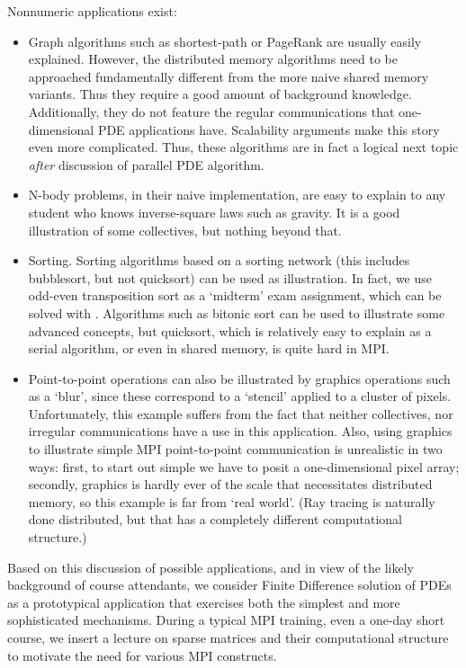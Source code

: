 Nonnumeric applications exist:
\begin{itemize}
\item Graph algorithms such as shortest-path or PageRank are usually
  easily explained. However, the distributed memory algorithms need to
  be approached fundamentally different from the more naive shared
  memory variants. Thus they require a good amount of background
  knowledge. Additionally, they do not feature the regular
  communications that one-dimensional PDE applications
  have. Scalability arguments make this story even more
  complicated. Thus, these algorithms are in fact a logical next topic
  \emph{after} discussion of parallel PDE algorithm.
\item N-body problems, in their naive implementation, are easy to
  explain to any student who knows inverse-square laws such as
  gravity. It is a good illustration of some collectives, but nothing
  beyond that.
\item Sorting. Sorting algorithms based on a sorting network (this
  includes bubblesort, but not quicksort) can be used as
  illustration. In fact, we use odd-even transposition sort as a
  `midterm' exam assignment, which can be solved with
  . Algorithms such as bitonic sort can be used to
  illustrate some advanced concepts, but quicksort, which is
  relatively easy to explain as a serial algorithm, or even in shared
  memory, is quite hard in \ac{MPI}.
\item Point-to-point operations can also be illustrated by graphics
  operations such as a `blur', since these correspond to a `stencil'
  applied to a cluster of pixels. Unfortunately, this example suffers
  from the fact that neither collectives, nor irregular communications
  have a use in this application. Also, using graphics to illustrate
  simple \ac{MPI} point-to-point communication is unrealistic in two
  ways: first, to start out simple we have to posit a one-dimensional
  pixel array; secondly, graphics is hardly ever of the scale that
  necessitates distributed memory, so this example is far from `real
  world'. (Ray tracing is naturally done distributed, but that has a
  completely different computational structure.)
\end{itemize}

Based on this discussion of possible applications, and in view of the
likely background of course attendants, we consider Finite Difference
solution of \acp{PDE} as a prototypical application that exercises
both the simplest and more sophisticated mechanisms. During a typical
MPI training, even a one-day short course, we insert a lecture on
sparse matrices and their computational structure to motivate the need
for various MPI constructs.

